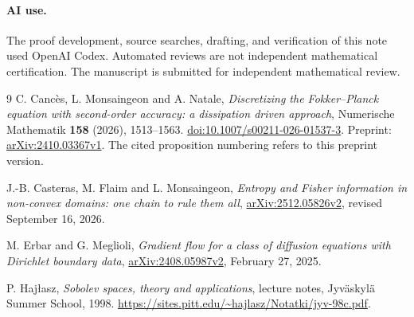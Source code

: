 \documentclass[11pt]{article}
\begin{document}
\paragraph{AI use.}
The proof development, source searches, drafting, and verification of this
note used OpenAI Codex. Automated reviews are not independent mathematical
certification. The manuscript is submitted for independent mathematical
review.

\begin{thebibliography}{9}
C. Canc\`es, L. Monsaingeon and A. Natale,
\emph{Discretizing the Fokker--Planck equation with second-order accuracy:
a dissipation driven approach},
Numerische Mathematik \textbf{158} (2026), 1513--1563.
\href{https://doi.org/10.1007/s00211-026-01537-3}{doi:10.1007/s00211-026-01537-3}.
Preprint: \href{https://arxiv.org/abs/2410.03367v1}{arXiv:2410.03367v1}.
The cited proposition numbering refers to this preprint version.

J.-B. Casteras, M. Flaim and L. Monsaingeon,
\emph{Entropy and Fisher information in non-convex domains: one chain to
rule them all},
\href{https://arxiv.org/abs/2512.05826v2}{arXiv:2512.05826v2},
revised September 16, 2026.

M. Erbar and G. Meglioli,
\emph{Gradient flow for a class of diffusion equations with Dirichlet
boundary data},
\href{https://arxiv.org/abs/2408.05987v2}{arXiv:2408.05987v2},
February 27, 2025.

P. Haj\l{}asz,
\emph{Sobolev spaces, theory and applications},
lecture notes, Jyv\"askyl\"a Summer School, 1998.
\url{https://sites.pitt.edu/~hajlasz/Notatki/jyv-98c.pdf}.
\end{thebibliography}
\end{document}

